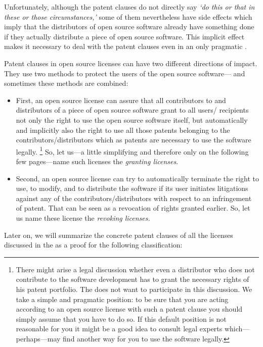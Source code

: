 Unfortunately, although the patent clauses do not directly say \emph{`do this or
that in these or those circumstances,'} some of them nevertheless have side
effects which imply that the distributors of open source software already
have something done if they actually distribute a piece of open
source software. This implicit effect makes it necessary to deal with the patent
clauses even in an only pragmatic \oslic.

Patent clauses in open source licenses can have two different directions of
impact. They use two methods to protect the users of the open source software---%
and sometimes these methods are combined:

\begin{itemize}
  \item First, an open source license can assure that all contributors to and
  distributors of a piece of open source software grant to all users/%
  recipients not only the right to use the open source software itself, but
  automatically and implicitly also the right to use all those patents 
  belonging to the contributors/distributors which as patents are necessary
  to use the software legally.%
    \footnote{There might arise a legal discussion
    whether even a distributor who does not contribute to the software development
    has to grant the necessary rights of his patent
    portfolio. The \oslic{} does not want to participate in this discussion. We take a
    simple and pragmatic position: to be sure that you are acting according to
    an open source license with such a patent clause you should simply assume that
    you have to do so. If this default position is not reasonable for you it might
    be a good idea to consult legal experts which---perhaps---may find another
    way for you to use the software legally.} 
  So, let us---a little simplifying and therefore only on the following few
  pages---name such licenses the \emph{granting licenses}.
  \item Second, an open source license can try to automatically terminate the
  right to use, to modify, and to distribute the software if its user initiates
  litigations against any of the contributors/distributors with respect to an
  infringement of patent. That can be seen as a revocation of rights granted 
  earlier. So, let us name these license the \emph{revoking licenses.}
\end{itemize}

Later on, we will summarize the concrete patent clauses of all the licenses
discussed in the \oslic{} as a proof for the following classification:

